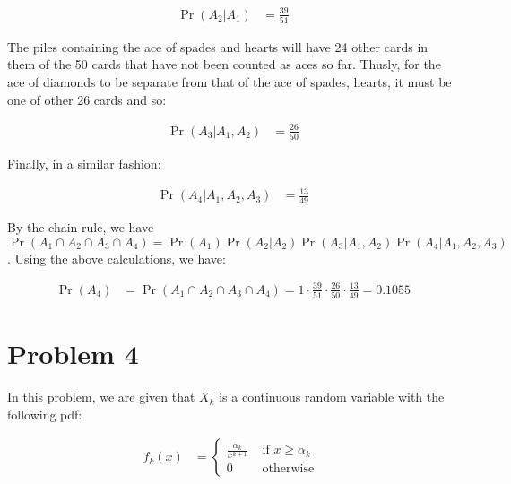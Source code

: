 \documentclass[11pt]{article}
\begin{document}
\begin{enumerate}[(a)]
    \begin{align*}
      \Pr(A_2 | A_1) &= \frac{39}{51}
    \end{align*}

    The piles containing the ace of spades and hearts will have 24 other cards in them of the 50 cards that have not been counted as aces so far.  Thusly, for the ace of diamonds to be separate from that of the ace of spades, hearts, it must be one of other 26 cards and so:

    \begin{align*}
      \Pr(A_3 | A_1, A_2) &= \frac{26}{50}
    \end{align*}

    Finally, in a similar fashion:

    \begin{align*}
      \Pr(A_4 | A_1, A_2, A_3) &= \frac{13}{49}
    \end{align*}

    By the chain rule, we have $\Pr(A_1 \cap A_2 \cap A_3 \cap A_4) = \Pr(A_1) \Pr(A_2 | A_2) \Pr(A_3 | A_1, A_2) \Pr(A_4 | A_1, A_2, A_3)$.  Using the above calculations, we have:

    \begin{align*}
      \Pr(A_4) &= \Pr(A_1 \cap A_2 \cap A_3 \cap A_4) = 1 \cdot \frac{39}{51} \cdot \frac{26}{50} \cdot \frac{13}{49} = 0.1055
    \end{align*}
\end{enumerate}

\section*{Problem 4}

In this problem, we are given that $X_k$ is a continuous random variable with the following pdf:

\begin{align*}
  f_k(x) &= 
  \begin{cases}
    \frac{\alpha_k}{x^{k+1}} & \text{ if } x \ge \alpha_k \\
    0 & \text{ otherwise }
  \end{cases}
\end{align*}
\end{document}
